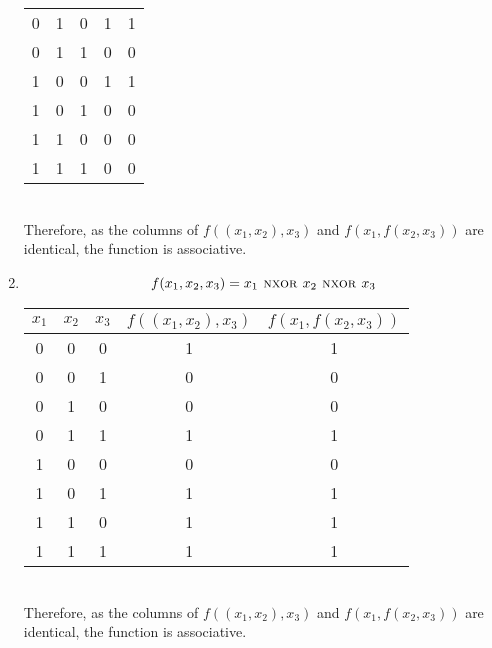 \documentclass[fleqn, a4paper, 11pt, oneside]{amsart}
\theoremstyle{definition}
\theoremstyle{theorem}
\theoremstyle{remark}
\newcommand{\Nxor}{{\textsc{ nxor }}}
\begin{document}
\begin{solution}
\begin{enumerate}
\begin{tabular}{|c|c|c||c|c|}
				0      & 1     & 0     & 1                  & 1                   \\
				0      & 1     & 1     & 0                  & 0                   \\
				1      & 0     & 0     & 1                  & 1                   \\
				1      & 0     & 1     & 0                  & 0                   \\
				1      & 1     & 0     & 0                  & 0                   \\
				1      & 1     & 1     & 0                  & 0                   \\
				\hline
			\end{tabular} \\
			Therefore, as the columns of $f((x_1,x_2),x_3)$ and $f(x_1,f(x_2,x_3))$ are identical, the function is associative.\\
		\item
			\begin{equation*}
				f(x_1,x_2,x_3) = x_1 \Nxor x_2 \Nxor x_3
			\end{equation*}
			\begin{tabular}{|c|c|c||c|c|}
				\hline
				$x_1$  & $x_2$ & $x_3$ & $f((x_1,x_2),x_3)$ & $f(x_1,f(x_2,x_3))$ \\
				\hline
				0      & 0     & 0     & 1                  & 1                   \\
				0      & 0     & 1     & 0                  & 0                   \\
				0      & 1     & 0     & 0                  & 0                   \\
				0      & 1     & 1     & 1                  & 1                   \\
				1      & 0     & 0     & 0                  & 0                   \\
				1      & 0     & 1     & 1                  & 1                   \\
				1      & 1     & 0     & 1                  & 1                   \\
				1      & 1     & 1     & 1                  & 1                   \\
				\hline
			\end{tabular} \\
			Therefore, as the columns of $f((x_1,x_2),x_3)$ and $f(x_1,f(x_2,x_3))$ are identical, the function is associative.\\
	\end{enumerate}
\end{solution}
\end{document}
